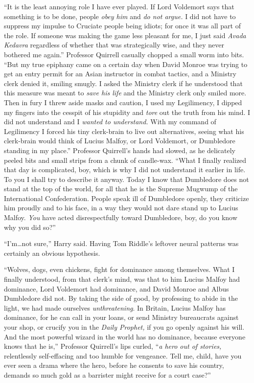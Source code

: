 “It is the least annoying role I have ever played. If Lord Voldemort says that something is to be done, people \emph{obey him} and \emph{do not argue.} I did not have to suppress my impulse to Cruciate people being idiots; for once it was all part of the role. If someone was making the game less pleasant for me, I just said \emph{Avada Kedavra} regardless of whether that was strategically wise, and they never bothered me again.” Professor Quirrell casually chopped a small worm into bits. “But my true epiphany came on a certain day when David Monroe was trying to get an entry permit for an Asian instructor in combat tactics, and a Ministry clerk denied it, smiling smugly. I asked the Ministry clerk if he understood that this measure was meant to \emph{save his life} and the Ministry clerk only smiled more. Then in fury I threw aside masks and caution, I used my Legilimency, I dipped my fingers into the cesspit of his stupidity and \emph{tore} out the truth from his mind. I did not understand and I \emph{wanted to understand.} With my command of Legilimency I forced his tiny clerk-brain to live out alternatives, seeing what his clerk-brain would think of Lucius Malfoy, or Lord Voldemort, or Dumbledore standing in my place.” Professor Quirrell’s hands had slowed, as he delicately peeled bits and small strips from a chunk of candle-wax. “What I finally realized that day is complicated, boy, which is why I did not understand it earlier in life. To you I shall try to describe it anyway. Today I know that Dumbledore does not stand at the top of the world, for all that he is the Supreme Mugwump of the International Confederation. People speak ill of Dumbledore openly, they criticize him proudly and to his face, in a way they would not dare stand up to Lucius Malfoy. \emph{You} have acted disrespectfully toward Dumbledore, boy, do you know why you did so?”

“I’m…not sure,” Harry said. Having Tom Riddle’s leftover neural patterns was certainly an obvious hypothesis.

“Wolves, dogs, even chickens, fight for dominance among themselves. What I finally understood, from that clerk’s mind, was that to him Lucius Malfoy had dominance, Lord Voldemort had dominance, and David Monroe and Albus Dumbledore did not. By taking the side of good, by professing to abide in the light, we had made ourselves \emph{unthreatening}. In Britain, Lucius Malfoy has dominance, for he can call in your loans, or send Ministry bureaucrats against your shop, or crucify you in the \emph{Daily Prophet,} if you go openly against his will. And the most powerful wizard in the world has no dominance, because everyone knows that he is,” Professor Quirrell’s lips curled, “\emph{a hero out of stories,} relentlessly self-effacing and too humble for vengeance. Tell me, child, have you ever seen a drama where the hero, before he consents to save his country, demands so much gold as a barrister might receive for a court case?”

